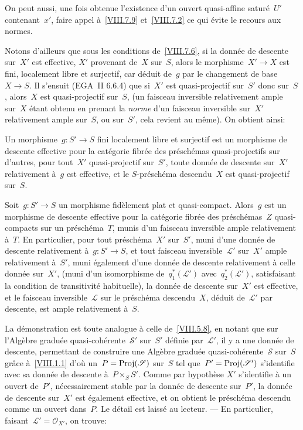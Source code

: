 On peut aussi, une fois obtenue l'existence d'un ouvert quasi-affine
satur\'e~$U'$ contenant~$x'$, faire appel \`a~\ref{VIII.7.9}
et~\ref{VIII.7.2} ce qui \'evite le recours aux normes.

Notons d'ailleurs que sous les conditions de~\ref{VIII.7.6}, si la
donn\'ee de descente sur~$X'$ est effective, $X'$ provenant de~$X$
sur~$S$, alors le morphisme~$X'\to X$ est fini, localement libre et
surjectif, car d\'eduit de~$g$ par le changement de base~$X\to
S$. Il s'ensuit (EGA~II 6.6.4) que si~$X'$ est quasi-projectif
sur~$S'$ donc sur~$S$, alors~$X$ est quasi-projectif sur~$S$, (un
faisceau inversible relativement ample sur~$X$ \'etant obtenu en
prenant la \emph{norme} d'un faisceau inversible sur~$X'$ relativement
ample sur~$S$, ou sur~$S'$, cela revient au m\^eme). On obtient
ainsi:

\begin{corollaire}
\label{VIII.7.7}
Un morphisme~$g\colon S'\to S$ fini localement libre et surjectif est
un morphisme de descente effective pour la cat\'egorie fibr\'ee
des pr\'esch\'emas quasi-projectifs sur d'autres, \ie pour
tout~$X'$ quasi-projectif sur~$S'$, toute donn\'ee de descente
sur~$X'$ relativement \`a~$g$ est effective, et le
$S$-pr\'esch\'ema descendu~$X$ est quasi-projectif sur~$S$.
\end{corollaire}

\begin{proposition}
\label{VIII.7.8}
Soit~$g\colon S'\to S$ un morphisme fid\`element plat et
quasi-compact. Alors~$g$ est un morphisme de descente effective pour
la cat\'egorie fibr\'ee des pr\'esch\'emas~$Z$ quasi-compacts
sur un pr\'esch\'ema~$T$, munis d'un faisceau inversible ample
relativement \`a~$T$. En particulier, pour tout
pr\'esch\'ema~$X'$ sur~$S'$, muni d'une donn\'ee de descente
relativement \`a~$g\colon S'\to S$, et tout faisceau
inversible~$\mathcal{L}'$ sur~$X'$ ample relativement \`a~$S'$, muni
\'egalement d'une donn\'ee de descente relativement \`a celle
donn\'ee sur~$X'$, (\ie muni d'un isomorphisme
de~$q_{1}^*(\mathcal{L}')$ avec~$q_{2}^*(\mathcal{L}')$,
satisfaisant la condition de transitivit\'e habituelle), la
donn\'ee de descente sur~$X'$ est effective, et le faisceau
inversible~$\mathcal{L}$ sur le pr\'esch\'ema descendu~$X$,
d\'eduit de~$\mathcal{L}'$ par descente, est ample relativement
\`a~$S$.
\end{proposition}

La d\'emonstration est toute analogue \`a celle de~\ref{VIII.5.8},
en notant que sur l'Alg\`ebre gradu\'ee
quasi-coh\'erente~$\mathcal{S}'$ sur~$S'$ d\'efinie
par~$\mathcal{L}'$, il y a une donn\'ee de descente, permettant de
construire une Alg\`ebre gradu\'ee
quasi-coh\'erente~$\mathcal{S}$ sur~$S$ gr\^ace
\`a~\ref{VIII.1.1} d'o\`u un~$P=\operatorname{Proj}(\mathscr{S})$ sur~$S$ tel
que~$P'=\operatorname{Proj}(\mathscr{S}')$ s'identifie avec sa donn\'ee de
descente \`a~$P\times_{S}S'$. Comme par hypoth\`ese $X'$
s'identifie \`a un ouvert de~$P'$, n\'ecessairement stable par la
donn\'ee de descente sur~$P'$, la donn\'ee de descente sur~$X'$
est \'egalement effective, et on obtient le pr\'esch\'ema
descendu comme un ouvert dans~$P$. Le d\'etail est laiss\'e au
lecteur. --- En particulier, faisant~$\mathcal{L}'=\mathcal{O}_{X'}$, on
trouve:

